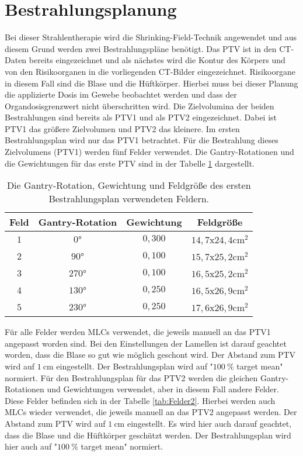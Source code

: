 \section{Bestrahlungsplanung}
\label{sec:Bestrahlungsplanung}
Bei dieser Strahlentherapie wird die Shrinking-Field-Technik angewendet und aus diesem Grund werden zwei Bestrahlungspläne benötigt. Das PTV ist in den CT-Daten bereits eingezeichnet und als nächstes wird die Kontur des Körpers und von den Risikoorganen in die vorliegenden CT-Bilder eingezeichnet. Risikoorgane in diesem Fall sind die Blase und die Hüftkörper. Hierbei muss bei dieser Planung die applizierte Dosis im Gewebe beobachtet werden und dass der Organdosisgrenzwert nicht überschritten wird. Die Zielvolumina der beiden Bestrahlungen sind bereits als PTV1 und als PTV2 eingezeichnet. Dabei ist PTV1 das größere Zielvolumen und PTV2 das kleinere. Im ersten Bestrahlungsplan wird nur das PTV1 betrachtet. Für die Bestrahlung dieses Zielvolumens (PTV1) werden fünf Felder verwendet. Die Gantry-Rotationen und die Gewichtungen für das erste PTV sind in der Tabelle \ref{tab:Felder1} dargestellt.

\begin{table}
	\centering
	\caption{Die Gantry-Rotation, Gewichtung und Feldgröße des ersten Bestrahlungsplan verwendeten Feldern.}
	\label{tab:Felder1}
	\begin{tabular}{c c c c}
		\toprule
		Feld & Gantry-Rotation & Gewichtung & Feldgröße\\
		\midrule
		$1$ & $0°$ & $0,300$ & $14,7$x$24,4 \si{\centi\meter\squared}$ \\
		$2$ & $90°$ & $0,100$ & $15,7$x$25,2 \si{\centi\meter\squared}$ \\
		$3$ & $270°$ & $0,100$ & $16,5$x$25,2 \si{\centi\meter\squared}$ \\
		$4$ & $130°$ & $0,250$ & $16,5$x$26,9 \si{\centi\meter\squared}$ \\
		$5$ & $230°$ & $0,250$ & $17,6$x$26,9 \si{\centi\meter\squared}$ \\
		\bottomrule
	\end{tabular}
\end{table}

Für alle Felder werden MLCs verwendet, die jeweils manuell an das PTV1 angepasst worden sind. Bei den Einstellungen der Lamellen ist darauf geachtet worden, dass die Blase so gut wie möglich geschont wird. Der Abstand zum PTV wird auf $\SI{1}{\centi\meter}$ eingestellt. Der Bestrahlungsplan wird auf "$\SI{100}{\percent}$ target mean"  normiert.
Für den Bestrahlungsplan für das PTV2 werden die gleichen Gantry-Rotationen und Gewichtungen verwendet, aber in diesem Fall andere Felder. Diese Felder befinden sich in der Tabelle \ref{tab:Felder2}. Hierbei werden auch MLCs wieder verwendet, die jeweils manuell an das PTV2 angepasst werden. Der Abstand zum PTV wird auf $\SI{1}{\centi\meter}$ eingestellt. Es wird hier auch darauf geachtet, dass die Blase und die Hüftkörper geschützt werden. Der Bestrahlungsplan wird hier auch auf "$\SI{100}{\percent}$ target mean" normiert.

